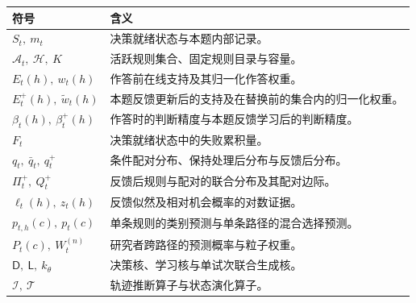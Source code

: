 \documentclass[11pt,a4paper]{article}
\numberwithin{equation}{section}
\newcommand{\A}{\mathcal{A}}
\newcommand{\Hh}{\mathcal{H}}
\newcommand{\Dd}{\mathsf{D}}
\newcommand{\Ll}{\mathsf{L}}
\newcommand{\Ii}{\mathcal{I}}
\newcommand{\Tt}{\mathcal{T}}
\begin{document}
{\small
\begin{longtable}{L{3.0cm}L{11.5cm}}
\toprule
符号 & 含义\\
\midrule\endhead
$S_t,\ m_t$ & 决策就绪状态与本题内部记录。\\
$\A_t,\ \Hh,\ K$ & 活跃规则集合、固定规则目录与容量。\\
$E_t(h),\ w_t(h)$ & 作答前在线支持及其归一化作答权重。\\
$E_t^+(h),\ \widetilde w_t(h)$ & 本题反馈更新后的支持及在替换前的集合内的归一化权重。\\
$\beta_t(h),\ \beta_t^+(h)$ & 作答时的判断精度与本题反馈学习后的判断精度。\\
$F_t$ & 决策就绪状态中的失败累积量。\\
$q_t,\ \bar q_t,\ q_t^+$ & 条件配对分布、保持处理后分布与反馈后分布。\\
$\Pi_t^+,\ Q_t^+$ & 反馈后规则与配对的联合分布及其配对边际。\\
$\ell_t(h),\ z_t(h)$ & 反馈似然及相对机会概率的对数证据。\\
$p_{t,h}(c),\ p_t(c)$ & 单条规则的类别预测与单条路径的混合选择预测。\\
$P_t(c),\ W_t^{(n)}$ & 研究者跨路径的预测概率与粒子权重。\\
$\Dd,\ \Ll,\ k_\theta$ & 决策核、学习核与单试次联合生成核。\\
$\Ii,\ \Tt$ & 轨迹推断算子与状态演化算子。\\
\bottomrule
\end{longtable}}
\end{document}
